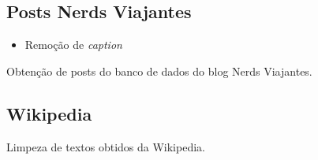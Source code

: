 \subsection{Posts Nerds Viajantes}

\begin{itemize}
    \item Remoção de \textit{caption}
\end{itemize}

Obtenção de posts do banco de dados do blog Nerds Viajantes.

\subsection{Wikipedia}

Limpeza de textos obtidos da Wikipedia.

